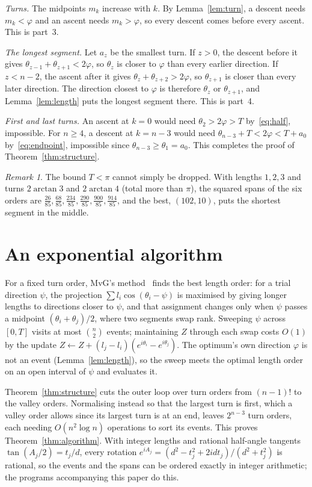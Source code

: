 \documentclass[11pt]{article}
\theoremstyle{remark}
\newtheorem*{remark}{Remark}
\begin{document}
\emph{Turns.} The midpoints $m_k$ increase with $k$. By Lemma~\ref{lem:turn}, a descent needs $m_k<\varphi$ and an ascent needs $m_k>\varphi$, so every descent comes before every ascent. This is part~3.

\emph{The longest segment.} Let $a_z$ be the smallest turn. If $z>0$, the descent before it gives $\theta_{z-1}+\theta_{z+1}<2\varphi$, so $\theta_z$ is closer to $\varphi$ than every earlier direction. If $z<n-2$, the ascent after it gives $\theta_z+\theta_{z+2}>2\varphi$, so $\theta_{z+1}$ is closer than every later direction. The direction closest to $\varphi$ is therefore $\theta_z$ or $\theta_{z+1}$, and Lemma~\ref{lem:length} puts the longest segment there. This is part~4.

\emph{First and last turns.} An ascent at $k=0$ would need $\theta_2>2\varphi>T$ by~\eqref{eq:half}, impossible. For $n\ge4$, a descent at $k=n-3$ would need $\theta_{n-3}+T<2\varphi<T+a_0$ by~\eqref{eq:endpoint}, impossible since $\theta_{n-3}\ge\theta_1=a_0$. This completes the proof of Theorem~\ref{thm:structure}.

\begin{remark}
The bound $T<\pi$ cannot simply be dropped. With lengths $1,2,3$ and turns $2\arctan3$ and $2\arctan4$ (total more than $\pi$), the squared spans of the six orders are $\frac{26}{85},\frac{68}{85},\frac{234}{85},\frac{290}{85},\frac{900}{85},\frac{914}{85}$, and the best, $(102,10)$, puts the shortest segment in the middle.
\end{remark}

\section{An exponential algorithm}\label{sec:algorithm}

For a fixed turn order, MvG's method~\cite{mvg} finds the best length order: for a trial direction $\psi$, the projection $\sum l_i\cos(\theta_i-\psi)$ is maximised by giving longer lengths to directions closer to $\psi$, and that assignment changes only when $\psi$ passes a midpoint $(\theta_i+\theta_j)/2$, where two segments swap rank. Sweeping $\psi$ across $[0,T]$ visits at most $\binom n2$ events; maintaining $Z$ through each swap costs $O(1)$ by the update $Z\leftarrow Z+(l_j-l_i)(e^{i\theta_i}-e^{i\theta_j})$. The optimum's own direction $\varphi$ is not an event (Lemma~\ref{lem:length}), so the sweep meets the optimal length order on an open interval of $\psi$ and evaluates it.

Theorem~\ref{thm:structure} cuts the outer loop over turn orders from $(n-1)!$ to the valley orders. Normalising instead so that the largest turn is first, which a valley order allows since its largest turn is at an end, leaves $2^{n-3}$ turn orders, each needing $O(n^2\log n)$ operations to sort its events. This proves Theorem~\ref{thm:algorithm}. With integer lengths and rational half-angle tangents $\tan(A_j/2)=t_j/d$, every rotation $e^{iA_j}=(d^2-t_j^2+2idt_j)/(d^2+t_j^2)$ is rational, so the events and the spans can be ordered exactly in integer arithmetic; the programs accompanying this paper do this.
\end{document}
